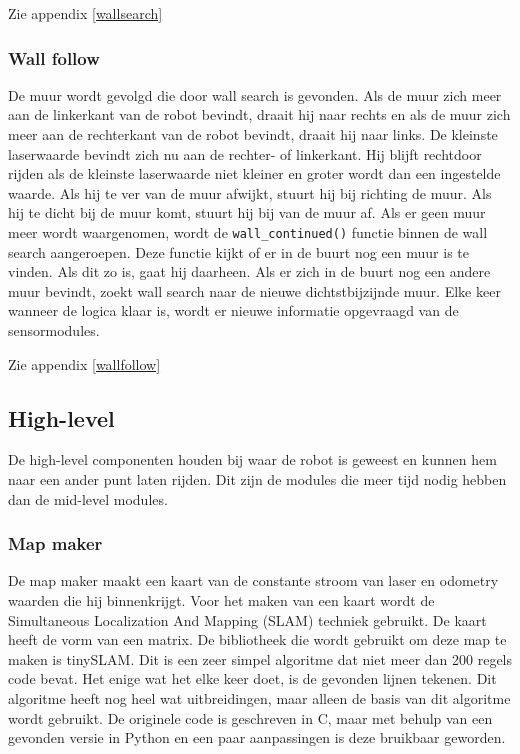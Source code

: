 \documentclass[a4paper,10pt]{article}
\begin{document}
Zie appendix \ref{wallsearch}

\subsubsection{Wall follow}
De muur wordt gevolgd die door wall search is gevonden. Als de muur zich meer aan de linkerkant van de robot bevindt, draait hij naar rechts en als de muur zich meer aan de rechterkant van de robot bevindt, draait hij naar links. De kleinste laserwaarde bevindt zich nu aan de rechter- of linkerkant. Hij blijft rechtdoor rijden als de kleinste laserwaarde niet kleiner en groter wordt dan een ingestelde waarde. Als hij te ver van de muur afwijkt, stuurt hij bij richting de muur. Als hij te dicht bij de muur komt, stuurt hij bij van de muur af. Als er geen muur meer wordt waargenomen, wordt de \verb!wall_continued()! functie binnen de wall search aangeroepen. Deze functie kijkt of er in de buurt nog een muur is te vinden. Als dit zo is, gaat hij daarheen. Als er zich in de buurt nog een andere muur bevindt, zoekt wall search naar de nieuwe dichtstbijzijnde muur. Elke keer wanneer de logica klaar is, wordt er nieuwe informatie opgevraagd van de sensormodules.%

Zie appendix \ref{wallfollow}

\subsection{High-level}
De high-level componenten houden bij waar de robot is geweest en kunnen hem naar een ander punt laten rijden. Dit zijn de modules die meer tijd nodig hebben dan de mid-level modules.

\subsubsection{Map maker}
De map maker maakt een kaart van de constante stroom van laser en odometry waarden die hij binnenkrijgt. Voor het maken van een kaart wordt de Simultaneous Localization And Mapping (SLAM) techniek gebruikt. De kaart heeft de vorm van een matrix.
De bibliotheek die wordt gebruikt om deze map te maken is tinySLAM. Dit is een zeer simpel algoritme dat niet meer dan 200 regels code bevat. Het enige wat het elke keer doet, is de gevonden lijnen tekenen. Dit algoritme heeft nog heel wat uitbreidingen, maar alleen de basis van dit algoritme wordt gebruikt. De originele code is geschreven in C, maar met behulp van een gevonden versie in Python en een paar aanpassingen is deze bruikbaar geworden.
\end{document}
